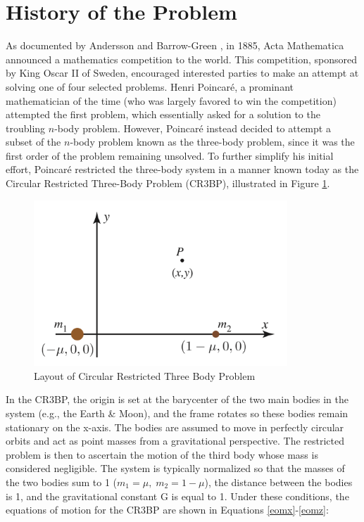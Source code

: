 \documentclass[11pt]{article} %
\begin{document}
\section*{History of the Problem} %
As documented by Andersson and Barrow-Green \cite{Andersson1994,BarrowGreen1994}, in 1885, Acta Mathematica announced a mathematics competition to the world. This competition, sponsored by King Oscar II of Sweden, encouraged interested parties to make an attempt at solving one of four selected problems. Henri Poincaré, a prominant mathematician of the time (who was largely favored to win the competition) attempted the first problem, which essentially asked for a solution to the troubling $n$-body problem. However, Poincaré instead decided to attempt a subset of the $n$-body problem known as the three-body problem, since it was the first order of the problem remaining unsolved. To further simplify his initial effort, Poincaré restricted the three-body system in a manner known today as the Circular Restricted Three-Body Problem (CR3BP), illustrated in Figure \ref{fig:CR3BP}. 

\begin{figure}[H]
\centering
\includegraphics[width=3.75in]{CR3BP.png}\nonumber
\caption{Layout of Circular Restricted Three Body Problem \cite{KoonLoMarsdenRoss2011}}
\label{fig:CR3BP}
\end{figure}

In the CR3BP, the origin is set at the barycenter of the two main bodies in the system (e.g., the Earth \& Moon), and the frame rotates so these bodies remain stationary on the x-axis. The bodies are assumed to move in perfectly circular orbits and act as point masses from a gravitational perspective. The restricted problem is then to ascertain the motion of the third body whose mass is considered negligible. The system is typically normalized so that the masses of the two bodies sum to 1 ($m_1 = \mu,\; m_2 = 1-\mu$), the distance between the bodies is 1, and the gravitational constant G is equal to 1. Under these conditions, the equations of motion for the CR3BP are shown in Equations \ref{eomx}-\ref{eomz}:
\end{document}
